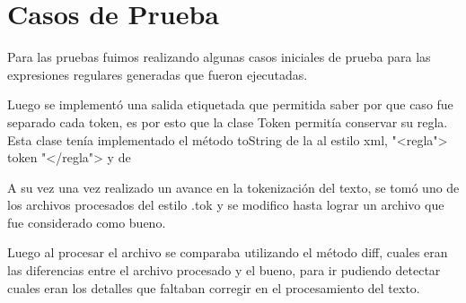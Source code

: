 \section{Casos de Prueba}

Para las pruebas fuimos realizando algunas casos iniciales de prueba para las expresiones regulares generadas que fueron ejecutadas.

Luego se implement\'o una salida etiquetada que permitida saber por que caso fue separado cada token, es por esto que la clase Token permit\'ia conservar su regla. 
Esta clase ten\'ia implementado el m\'etodo toString de la al estilo xml,  "<regla">  token "</regla"> y de

A su vez una vez realizado un avance en la tokenizaci\'on del texto, se tom\'o uno de los archivos procesados del estilo .tok y se modifico hasta lograr un archivo que fue considerado como bueno. 

Luego al procesar el archivo se comparaba utilizando el m\'etodo diff, cuales eran las diferencias entre el archivo procesado y el bueno, para ir pudiendo detectar cuales eran los detalles que faltaban corregir en el procesamiento del texto. 


\bigskip
